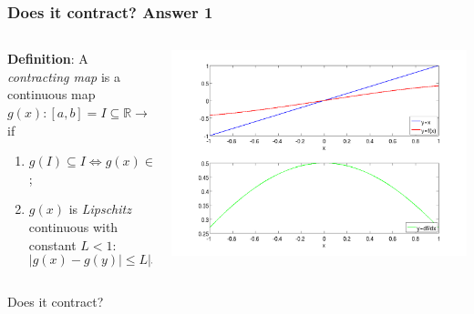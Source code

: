 \documentclass{beamer}
\begin{document}
\begin{frame}
\frametitle{Does it contract? Answer 1}

\begin{columns}
    \begin{column}{0.45\textwidth}
  {\bf Definition}: A \emph{contracting map} is a continuous map
  $g(x) : [a, b] = I \subseteq \mathbb{R} \rightarrow \mathbb{R}$ if
\begin{enumerate}
  \item $g(I) \subseteq I \Leftrightarrow g(x) \in I \, \, \, \forall
    x \in I$;
  \item $g(x)$ is \emph{Lipschitz} continuous with constant $L < 1$:
    \begin{equation*}
      | g(x) - g(y) | \leq L | x - y | \, \, \, \forall x, y \in I.
    \end{equation*}
  \end{enumerate}
\end{column}
\begin{column}{0.55\textwidth}
  \begin{center}
   \includegraphics[width=\textwidth]{figures/cmap1}
  \end{center}
\end{column}
\end{columns}
\begin{overlayarea}{\textwidth}{0.1\textheight}
Does it contract?  
\end{overlayarea}
\end{frame}
\end{document}
